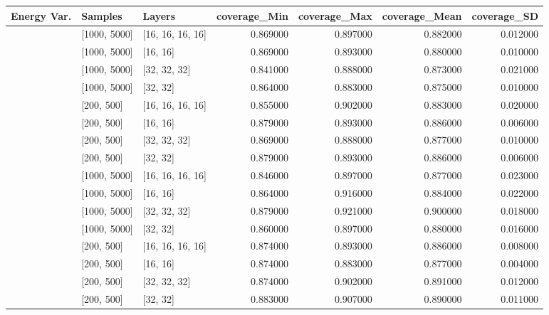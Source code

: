 \begin{tabular}{lllrrrr}
\toprule
Energy Var. & Samples & Layers & coverage_Min & coverage_Max & coverage_Mean & coverage_SD \\
\midrule
[0.001, 0.0001] & [1000, 5000] & [16, 16, 16, 16] & 0.869000 & 0.897000 & 0.882000 & 0.012000 \\
[0.001, 0.0001] & [1000, 5000] & [16, 16] & 0.869000 & 0.893000 & 0.880000 & 0.010000 \\
[0.001, 0.0001] & [1000, 5000] & [32, 32, 32] & 0.841000 & 0.888000 & 0.873000 & 0.021000 \\
[0.001, 0.0001] & [1000, 5000] & [32, 32] & 0.864000 & 0.883000 & 0.875000 & 0.010000 \\
[0.001, 0.0001] & [200, 500] & [16, 16, 16, 16] & 0.855000 & 0.902000 & 0.883000 & 0.020000 \\
[0.001, 0.0001] & [200, 500] & [16, 16] & 0.879000 & 0.893000 & 0.886000 & 0.006000 \\
[0.001, 0.0001] & [200, 500] & [32, 32, 32] & 0.869000 & 0.888000 & 0.877000 & 0.010000 \\
[0.001, 0.0001] & [200, 500] & [32, 32] & 0.879000 & 0.893000 & 0.886000 & 0.006000 \\
[0.1, 0.01] & [1000, 5000] & [16, 16, 16, 16] & 0.846000 & 0.897000 & 0.877000 & 0.023000 \\
[0.1, 0.01] & [1000, 5000] & [16, 16] & 0.864000 & 0.916000 & 0.884000 & 0.022000 \\
[0.1, 0.01] & [1000, 5000] & [32, 32, 32] & 0.879000 & 0.921000 & 0.900000 & 0.018000 \\
[0.1, 0.01] & [1000, 5000] & [32, 32] & 0.860000 & 0.897000 & 0.880000 & 0.016000 \\
[0.1, 0.01] & [200, 500] & [16, 16, 16, 16] & 0.874000 & 0.893000 & 0.886000 & 0.008000 \\
[0.1, 0.01] & [200, 500] & [16, 16] & 0.874000 & 0.883000 & 0.877000 & 0.004000 \\
[0.1, 0.01] & [200, 500] & [32, 32, 32] & 0.874000 & 0.902000 & 0.891000 & 0.012000 \\
[0.1, 0.01] & [200, 500] & [32, 32] & 0.883000 & 0.907000 & 0.890000 & 0.011000 \\
\bottomrule
\end{tabular}
